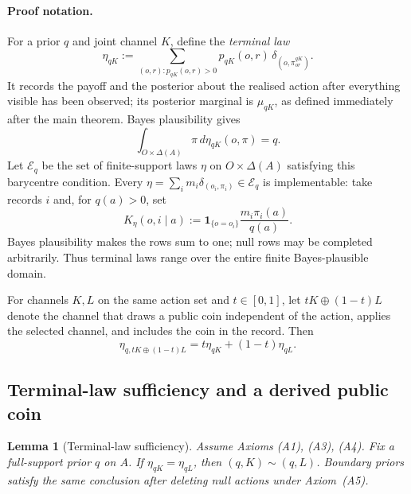 \documentclass[11pt,a4paper]{article}
\newtheorem{lemma}[theorem]{Lemma}
\theoremstyle{definition}
\newcommand{\D}{\Delta}
\newcommand{\1}{\mathbf 1}
\begin{document}
\paragraph{Proof notation.}
For a prior $q$ and joint channel $K$, define the \emph{terminal law}
\begin{equation}
 \eta_{qK}:=\sum_{(o,r):p_{qK}(o,r)>0}
 p_{qK}(o,r)\,\delta_{(o,\pi^{qK}_{or})}.
 \label{eq:terminal-law}
\end{equation}
It records the payoff and the posterior about the realised action after everything visible has been observed; its
posterior marginal is $\mu_{qK}$, as defined immediately after the main theorem.  Bayes plausibility gives
\[
 \int_{O\times\D(A)}\pi\,d\eta_{qK}(o,\pi)=q.
\]
Let $\mathcal E_q$ be the set of finite-support laws $\eta$ on $O\times\D(A)$ satisfying this barycentre condition.
Every $\eta=\sum_i m_i\delta_{(o_i,\pi_i)}\in\mathcal E_q$ is implementable: take records $i$ and, for $q(a)>0$,
set
\begin{equation}
 K_\eta(o,i\mid a)
 :=\mathbf 1_{\{o=o_i\}}\frac{m_i\pi_i(a)}{q(a)}.
 \label{eq:implementation}
\end{equation}
Bayes plausibility makes the rows sum to one; null rows may be completed arbitrarily.  Thus terminal laws range over
the entire finite Bayes-plausible domain.

For channels $K,L$ on the same action set and $t\in[0,1]$, let $tK\oplus(1-t)L$ denote the channel that draws a
public coin independent of the action, applies the selected channel, and includes the coin in the record.  Then
\begin{equation}
 \eta_{q,tK\oplus(1-t)L}=t\eta_{qK}+(1-t)\eta_{qL}.
 \label{eq:public-mixture}
\end{equation}

\subsection{Terminal-law sufficiency and a derived public coin}

\begin{lemma}[Terminal-law sufficiency]\label{lem:terminal-suff}
Assume Axioms \textup{(A1), (A3), (A4)}.  Fix a full-support prior $q$ on $A$.  If
$\eta_{qK}=\eta_{qL}$, then $(q,K)\sim(q,L)$.  Boundary priors satisfy the same conclusion after deleting null
actions under Axiom~\textup{(A5)}.
\end{lemma}
\end{document}
